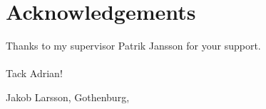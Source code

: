 \thispagestyle{plain}     %
\section*{Acknowledgements}
Thanks to my supervisor Patrik Jansson for your support.
\\
\\
Tack Adrian!

\vspace{1.5cm}
\hfill
Jakob Larsson, Gothenburg, \monthname \space \the\year

\newpage        %
\thispagestyle{empty}
\mbox{}
